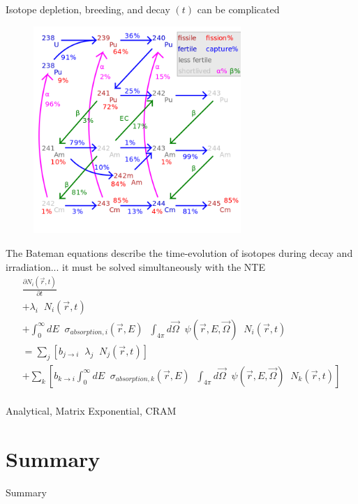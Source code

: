 \documentclass{beamer}
\begin{document}
        \begin{frame}{Isotope depletion, breeding, and decay $(t)$ can be complicated}
            \begin{figure}
                \centering
                \includegraphics[width=0.7\textwidth]{./img/fuelCycle.png}
                \caption*{}
            \end{figure}
        \end{frame}

        \begin{frame}{The Bateman equations describe the time-evolution of isotopes during decay and irradiation}{... it must be solved simultaneously with the NTE}
            \begin{equation*}
                \begin{split}
                    \frac{\partial N_i(\vec r, t)}{\partial t} \\
                    + \lambda_i \; \; N_i(\vec r, t) \\
                    + \int_0^\infty \! \! \! \! dE \; \; \sigma_{absorption,i} ( \vec r, E) \; \; \int_{4\pi} \! \! \! \! d\vec\Omega \; \; \psi(\vec r, E, \vec \Omega) \; \; N_i(\vec r, t) \\
                    = \sum_j \left[ b_{j \rightarrow i} \; \; \lambda_j \; \; N_j(\vec r, t) \right] \\
                    + \sum_k \left[ b_{k \rightarrow i} \int_0^\infty \! \! \! \! dE \; \; \sigma_{absorption,k} ( \vec r, E) \; \; \int_{4\pi} \! \! \! \! d\vec\Omega \; \; \psi(\vec r, E, \vec \Omega) \; \; N_k(\vec r, t) \right] \\
                \end{split}
            \end{equation*}
        \end{frame}

        \begin{frame}{Analytical, Matrix Exponential, CRAM}
        \end{frame}

\section*{Summary}

    \begin{frame}{Summary}
    \end{frame}
\end{document}
